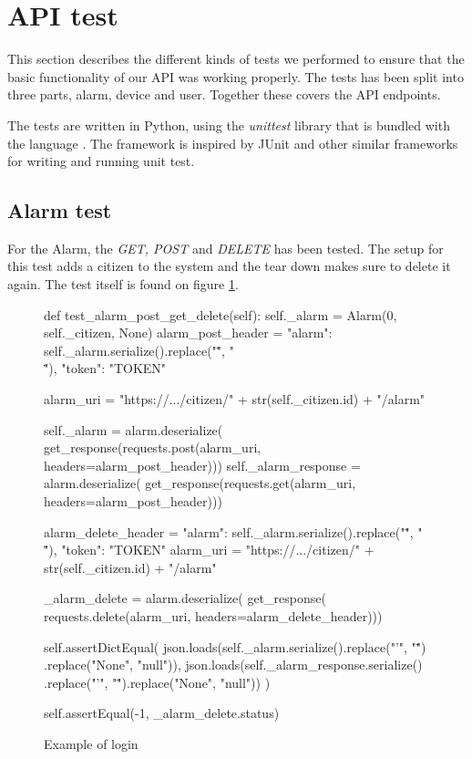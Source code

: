 \section{API test} 
This section describes the different kinds of tests we performed to ensure that the basic functionality of our API was working properly. The tests has been split into three parts, alarm, device and user. Together these covers the API endpoints.

The tests are written in Python, using the \textit{unittest} library that is bundled with the language \cite{unittest}. The framework is inspired by JUnit and other similar frameworks for writing and running unit test.

\subsection{Alarm test}
For the Alarm, the \textit{GET, POST} and \textit{DELETE} has been tested. The setup for this test adds a citizen to the system and the tear down makes sure to delete it again. The test itself is found on figure \ref{fig:test-alarm}.


\begin{figure}[H]
    \centering
    \begin{python}
def test_alarm_post_get_delete(self):
        self._alarm = Alarm(0, self._citizen, None)
        alarm_post_header = {"alarm": self._alarm.serialize().replace("\"", "\\\""), "token": "TOKEN"}

        alarm_uri = "https://.../citizen/" + str(self._citizen.id) + "/alarm"

        self._alarm = alarm.deserialize(
            get_response(requests.post(alarm_uri, headers=alarm_post_header)))
        self._alarm_response = alarm.deserialize(
            get_response(requests.get(alarm_uri,  headers=alarm_post_header)))

        alarm_delete_header = {"alarm": self._alarm.serialize().replace("\"", "\\\""), "token": "TOKEN"}
        alarm_uri = "https://.../citizen/" + str(self._citizen.id) + "/alarm"

        _alarm_delete = alarm.deserialize(
            get_response(
                requests.delete(alarm_uri, headers=alarm_delete_header)))

        self.assertDictEqual(
            json.loads(self._alarm.serialize().replace("'", "\"")
                .replace("None", "null")), 
            json.loads(self._alarm_response.serialize()
                .replace("'", "\"").replace("None", "null"))
        )
            
        self.assertEqual(-1, _alarm_delete.status)
        \end{python}
    \caption{Example of login}
    \label{fig:test-alarm}
\end{figure}

